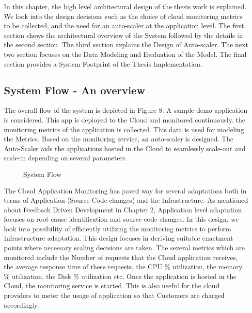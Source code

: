 \documentclass[article,type=msc,colorback,12pt,accentcolor=tud7b,table]{tudthesis}
\begin{document}
	In this chapter, the high level architectural design of the thesis work is explained. We look into the design decisions such as the choice of cloud monitoring metrics to be collected, and the need for an auto-scaler at the application level. The first section shows the architectural overview of the System followed by the details in the second section. The third section explains the Design of Auto-scaler. The next two section focuses on the Data Modeling and Evaluation of the Model. The final section provides a System Footprint of the Thesis Implementation.
 
\subsection{System Flow - An overview} 

	The overall flow of the system is depicted in Figure 8. A sample demo application is considered. This app is deployed to the Cloud and monitored continuously. the monitoring metrics of the application is collected. This data is used for modeling the Metrics. Based on the monitoring service, an auto-scaler is designed. The Auto-Scaler aids the applications hosted in the Cloud to seamlessly scale-out and scale-in depending on several parameters. 
	
		 \begin{figure}[!h]
		 	\begin{center}
		 		\makebox[\textwidth]{\texttt{[image: C1]}}
		 	\end{center}
		 	\caption{System Flow}
		 \end{figure}
		 
	
	The Cloud Application Monitoring has paved way for several adaptations both in terms of Application (Source Code changes) and the Infrastructure. As mentioned about Feedback Driven Development in Chapter 2, Application level adaptation focuses on root cause identification and source code changes. In this design, we look into possibility of efficiently utilizing the monitoring metrics to perform Infrastructure adaptation.  This design focuses in deriving suitable enactment points where necessary scaling decisions are taken. The several metrics which are monitored include the Number of requests that the Cloud application receives, the average response time of these requests, the CPU \% utilization, the memory \% utilization, the Disk \% utilization etc. Once the application is hosted in the Cloud, the monitoring service is started. This is also useful for the cloud providers to meter the usage of application so that Customers are charged accordingly.
 
\end{document}
